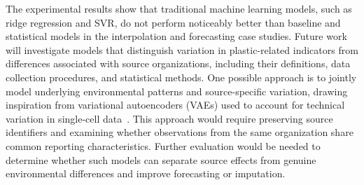 The experimental results show that traditional machine learning models, such as ridge regression and SVR, do not perform noticeably better than baseline and statistical models in the interpolation and forecasting case studies.
Future work will investigate models that distinguish variation in plastic-related indicators from differences associated with source organizations, including their definitions, data collection procedures, and statistical methods.
One possible approach is to jointly model underlying environmental patterns and source-specific variation, drawing inspiration from variational autoencoders (VAEs) used to account for technical variation in single-cell data~\cite{he2024mosaic}.
This approach would require preserving source identifiers and examining whether observations from the same organization share common reporting characteristics.
Further evaluation would be needed to determine whether such models can separate source effects from genuine environmental differences and improve forecasting or imputation.
